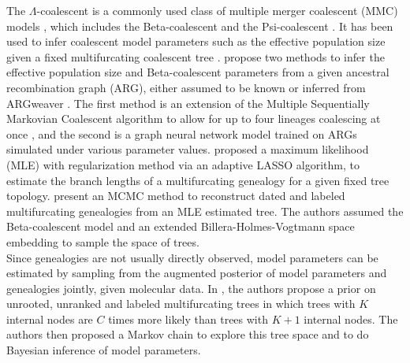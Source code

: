 \documentclass{article}
\begin{document}
The $\Lambda$-coalescent is a commonly used class of multiple merger coalescent (MMC) models \citep{pitman1999coalescents, sagitov1999general}, which includes the Beta-coalescent \citep{berestycki2007beta} and the Psi-coalescent \citep{eldon2006coalescent}. It has been used to infer coalescent model parameters such as the effective population size given a fixed multifurcating coalescent tree \citep{hoscheit2019multifurcating, zhang2025multiple}. \cite{korfmann2024simultaneous} propose two methods to infer the effective population size and Beta-coalescent parameters from a given ancestral recombination graph (ARG), either assumed to be known or inferred from ARGweaver \citep{rasmussen2014genome}. The first method is an extension of the Multiple Sequentially Markovian Coalescent algorithm to allow for up to four lineages coalescing at once \citep{schiffels2020msmc}, and the second is a graph neural network model trained on ARGs simulated under various parameter values. \cite{zhang2021nonbifurcating} proposed a maximum likelihood (MLE) with regularization method via an adaptive LASSO algorithm, to estimate the branch lengths of a multifurcating genealogy for a given fixed tree topology. \cite{helekal2025inference} present an MCMC method to reconstruct dated and labeled multifurcating genealogies from an MLE estimated tree. The authors assumed the Beta-coalescent model and an extended Billera-Holmes-Vogtmann space embedding to sample the space of trees. \\

Since genealogies are not usually directly observed, model parameters can be estimated by sampling from the augmented posterior of model parameters and genealogies jointly, given molecular data. In \citet{lewis2005polytomies}, the authors propose a prior on unrooted, unranked and labeled multifurcating trees in which trees with $K$ internal nodes are $C$ times more likely than trees with $K+1$ internal nodes. The authors then proposed a Markov chain to explore this tree space and to do Bayesian inference of model parameters.\\

\end{document}
